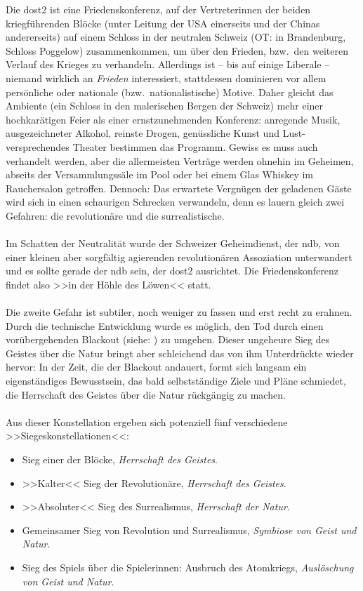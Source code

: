 Die \ac{dost2} ist eine Friedenskonferenz, auf der Vertreterinnen der beiden
kriegführenden Blöcke (unter Leitung der USA einerseits und der Chinas
andererseits) auf einem Schloss in der neutralen Schweiz (OT: in Brandenburg,
Schloss Poggelow) zusammenkommen, um über den Frieden, bzw.~den weiteren Verlauf
des Krieges zu verhandeln.
Allerdings ist -- bis auf einige Liberale -- niemand wirklich an \emph{Frieden}
interessiert, stattdessen dominieren vor allem persönliche oder nationale
(bzw.~nationalistische) Motive. Daher gleicht das Ambiente (ein Schloss in den
malerischen Bergen der Schweiz) mehr einer hochkarätigen Feier als einer
ernstzunehmenden Konferenz: anregende Musik, ausgezeichneter Alkohol, reinste
Drogen, genüssliche Kunst und Lust-versprechendes Theater bestimmen das
Programm. Gewiss es muss auch verhandelt werden, aber die allermeisten Verträge
werden ohnehin im Geheimen, abseits der Versammlungssäle im Pool oder bei einem
Glas Whiskey im Rauchersalon getroffen. Dennoch: Das erwartete Vergnügen der
geladenen Gäste wird sich in einen schaurigen Schrecken verwandeln, denn es
lauern gleich zwei Gefahren: die revolutionäre und die surrealistische.\\\\
%
Im Schatten der Neutralität wurde der Schweizer Geheimdienst, der \ac{ndb}, von
einer kleinen aber sorgfältig agierenden revolutionären Assoziation
unterwandert und es sollte gerade der \ac{ndb} sein, der \ac{dost2} ausrichtet.
Die Friedenskonferenz findet also >>in der Höhle des Löwen<< statt.\\\\
%
Die zweite Gefahr ist subtiler, noch weniger zu fassen und erst recht zu
erahnen. Durch die technische Entwicklung wurde es möglich, den Tod durch einen
vorübergehenden Blackout (siehe: ) zu umgehen.
Dieser ungeheure Sieg des Geistes über die Natur bringt aber schleichend das von
ihm Unterdrückte wieder hervor: 
In der Zeit, die der Blackout andauert, formt sich langsam ein eigenständiges
Bewusstsein, das bald selbstständige Ziele und Pläne schmiedet, die Herrschaft
des Geistes über die Natur rückgängig zu machen.\\\\
%
Aus dieser Konstellation ergeben sich potenziell fünf verschiedene
>>Siegeskonstellationen<<: 
\begin{itemize} 
  \item[] Sieg einer der Blöcke, \emph{Herrschaft des Geistes}.
  \item[] >>Kalter<< Sieg der Revolutionäre, \emph{Herrschaft des Geistes}.
  \item[] >>Absoluter<< Sieg des Surrealismus, \emph{Herrschaft der Natur}.
  \item[] Gemeinsamer Sieg von Revolution und Surrealismus, \emph{Symbiose von
    Geist und Natur}.
  \item[] Sieg des Spiels über die Spielerinnen: Ausbruch des Atomkriegs,
    \emph{Auslöschung von Geist und Natur}.
\end{itemize}
